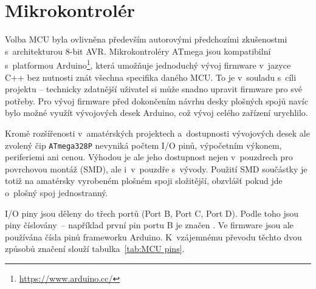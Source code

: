 \section{Mikrokontrolér}
Volba \acs{MCU} byla ovlivněna především autorovými předchozími zkušenostmi
s~architekturou 8-bit AVR. Mikrokontroléry ATmega jsou kompatibilní
s~platformou Arduino\footnote{\url{https://www.arduino.cc/}}, která umožňuje
jednoduchý vývoj firmware v~jazyce C++ bez nutnosti znát všechna specifika
daného MCU. To je v~souladu s~cíli projektu -- technicky zdatnější uživatel si
může snadno upravit firmware pro své potřeby. Pro vývoj firmware před
dokončením návrhu desky plošných spojů navíc bylo možné využít vývojových desek
Arduino, což vývoj celého zařízení urychlilo.

Kromě rozšířenosti v~amatérských projektech a~dostupnosti vývojových desek ale
zvolený čip \texttt{ATmega328P} nevyniká počtem I/O pinů, výpočetním
výkonem, periferiemi ani cenou. Výhodou je ale jeho dostupnost nejen
v~pouzdrech pro povrchovou montáž (\acs{SMD}), ale i~v~pouzdře s~vývody.
Použití SMD součástky je totiž na amatérsky vyrobeném plošném spoji složitější,
obzvlášť pokud jde o~plošný spoj jednostranný.

\nocite{dshATmega328} %

I/O piny jsou děleny do třech portů (Port B, Port C, Port D). Podle toho jsou
piny číslovány~-- například první pin portu B je značen . Ve
firmware jsou ale používána čísla pinů frameworku Arduino. K~vzájemnému převodu
těchto dvou způsobů značení slouží tabulka~\vref{tab:MCU pins}.

